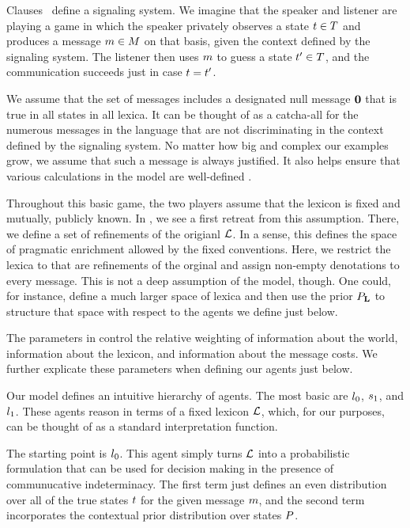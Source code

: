 \documentclass{article}
\begin{document}
Clauses~ define a signaling system. We
imagine that the speaker and listener are playing a game in which the
speaker privately observes a state $t \in T$ and produces a
message $m \in M$ on that basis, given the context defined
by the signaling system. The listener then uses $m$ to guess a
state $t' \in T$, and the communication succeeds just in
case $t = t'$.

We assume that the set of messages includes a designated null message
$\mathbf{0}$ that is true in all states in all lexica. It can be thought
of as a catcha-all for the numerous messages in the language that are
not discriminating in the context defined by the signaling system.  No
matter how big and complex our examples grow, we assume that such a
message is always justified. It also helps ensure that various
calculations in the model are well-defined \citep{Jaeger:2011}.

Throughout this basic game, the two players assume that the lexicon is
fixed and mutually, publicly known. In , we see a
first retreat from this assumption. There, we define a set of
refinements of the origianl $\mathcal{L}$. In a sense, this defines the space
of pragmatic enrichment allowed by the fixed conventions. Here, we
restrict the lexica to that are refinements of the orginal and assign
non-empty denotations to every message. This is not a deep assumption
of the model, though. One could, for instance, define a much larger
space of lexica and then use the prior $P_{\mathbf{L}}$ to structure
that space with respect to the agents we define just below.

The parameters in  control the relative weighting
of information about the world, information about the lexicon, and
information about the message costs. We further explicate these
parameters when defining our agents just below.


Our model defines an intuitive hierarchy of agents. The most basic are
$l_{0}$, $s_{1}$, and $l_{1}$. These agents
reason in terms of a fixed lexicon $\mathcal{L}$, which, for our purposes,
can be thought of as a standard interpretation function. 

The starting point is $l_{0}$. This agent simply turns $\mathcal{L}$
into a probabilistic formulation that can be used for decision making
in the presence of communucative indeterminacy. The first term just
defines an even distribution over all of the true states $t$ for
the given message $m$, and the second term incorporates the
contextual prior distribution over states $P$.
\end{document}
